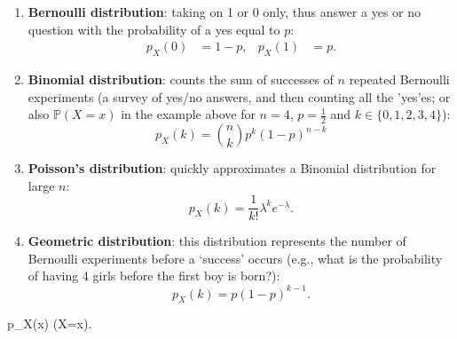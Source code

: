 \documentclass{article}
\begin{document}
\begin{spexample}
\begin{enumerate}\itemsep0em
    \item \textbf{Bernoulli distribution}: taking on 1 or 0 only, thus answer a yes or no question with the probability of a yes equal to $p$:
    \begin{align}
        p_X(0)&=1-p,& p_X(1)&=p.
    \end{align}
    \item \textbf{Binomial distribution}: counts the sum of successes of $n$ repeated Bernoulli experiments (a survey of yes/no answers, and then counting all the 'yes'es; or also $\mathbb{P}(X=x)$ in the example above for $n=4$, $p=\frac{1}{2}$ and $k\in\{0,1,2,3,4\}$):
    \begin{equation}
        p_X(k) = \binom{n}{k}p^k(1-p)^{n-k}
    \end{equation}
    \item \textbf{Poisson's distribution}: quickly approximates a Binomial distribution for large $n$:
    \begin{equation}
        p_X(k) = \frac{1}{k!}\lambda^{k}e^{-\lambda}.
    \end{equation}
    \item \textbf{Geometric distribution}: this distribution represents the number of Bernoulli experiments before a `success' occurs (e.g., what is the probability of having 4 girls before the first boy is born?):
    \begin{equation}
        p_X(k)=p(1-p)^{k-1}.
    \end{equation}
\end{enumerate}
\end{spexample}
\begin{mymathbox}[ams align, title={Probability mass function (definition)}, colframe=blue!30!black, center title]
    p_X(x) \equiv {}(X=x).
\end{mymathbox}
\end{document}
